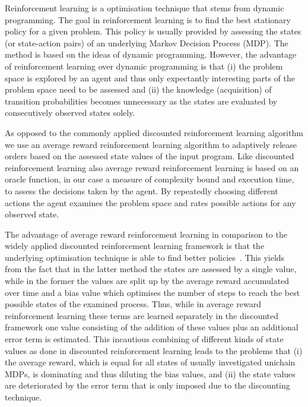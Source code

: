 \documentclass[envcountsame]{llncs}
\begin{document}
Reinforcement learning is a optimisation technique that stems from dynamic programming. The goal in
reinforcement learning is to find the best stationary policy for a given problem. This policy is
usually provided by assessing the states (or state-action pairs) of an underlying Markov Decision
Process (MDP). The method is based on the ideas of dynamic programming. However, the advantage of
reinforcement learning over dynamic programming is that (i) the problem space is explored by an
agent and thus only expectantly interesting parts of the problem space need to be assessed and (ii)
the knowledge (acquisition) of transition probabilities becomes unnecessary as the states are
evaluated by consecutively observed states solely.

As opposed to the commonly applied discounted reinforcement learning algorithm we use an average
reward reinforcement learning algorithm to adaptively release orders based on the assessed state
values of the input program. Like discounted reinforcement learning also average reward
reinforcement learning is based on an oracle function, in our case a measure of complexity bound and
execution time, to assess the decisions taken by the agent. By repeatedly choosing different actions
the agent examines the problem space and rates possible actions for any observed state.

The advantage of average reward reinforcement learning in comparison to the widely applied
discounted reinforcement learning framework is that the underlying optimisation technique is able to
find better policies~\cite{miller1969discrete,Puterman94}. This yields from the fact that in the
latter method the states are assessed by a single value, while in the former the values are split up
by the average reward accumulated over time and a bias value which optimises the number of steps to
reach the best possible states of the examined process. Thus, while in average reward reinforcement
learning these terms are learned separately in the discounted framework one value consisting of the
addition of these values plus an additional error term is estimated. This incautious combining of
different kinds of state values as done in discounted reinforcement learning leads to the problems
that (i) the average reward, which is equal for all states of usually investigated unichain MDPs, is
dominating and thus diluting the bias values, and (ii) the state values are deteriorated by the
error term that is only imposed due to the discounting technique.
\end{document}

